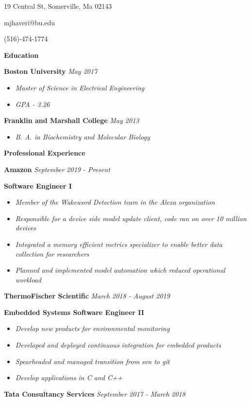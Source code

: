 \documentclass[8pt]{extarticle}
\begin{document}
\begin{center} 

19 Central St, Somerville, Ma 02143

mjhaveri@bu.edu 

(516)-474-1774 
\end{center} 
\begin{changemargin}{-0.8cm}{0.0cm}
\textbf{Education}
\end{changemargin}
\vspace*{-0.4cm}
\makebox[\linewidth]{\rule{17cm}{0.4pt}}
\textbf{Boston University} \textit{May 2017}
\begin{itemize}
\item \textit{Master of Science in Electrical Engineering}
\item \textit{GPA - 3.26}
\end{itemize}
\textbf{Franklin and Marshall College} \textit{May 2013}
\begin{itemize}
\item \textit{B. A. in Biochemistry and Molecular Biology }

\end{itemize}
\begin{changemargin}{-0.8cm}{0.0cm}
	\textbf{Professional Experience}
\end{changemargin}
\vspace*{-0.4cm}
\makebox[\linewidth]{\rule{17cm}{0.4pt}}
\textbf{Amazon} \textit{September 2019 - Present}

{\tiny }
\textbf{Software Engineer I}
\begin{itemize}
	\item \textit{Member of the Wakeword Detection team in the Alexa organization}
	\item \textit{Responsible for a device side model update client, code ran on over 10 million devices}
	\item \textit{Integrated a memory efficient metrics specializer to enable better data collection for researchers}
	\item \textit{Planned and implemented model automation which reduced operational workload}
\end{itemize}
\textbf{ThermoFischer Scientific} \textit{March 2018 - August 2019}

{\tiny }
\textbf{Embedded Systems Software Engineer II}
\begin{itemize}
	\item \textit{Develop new products for environmental monitoring}
	\item \textit{Developed and deployed continuous integration for embedded products}
	\item \textit{Spearheaded and managed transition from svn to git}
	\item \textit{Develop applications in C and C++}
\end{itemize}
\textbf{Tata Consultancy Services} \textit{September 2017 - March 2018}
\end{document}
